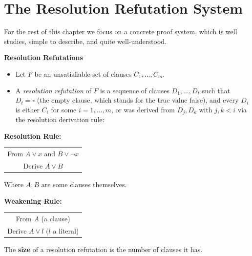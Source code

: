\section{The Resolution Refutation  System} 

For the rest of this chapter we focus on a  concrete proof system, which is well studies, simple to describe, and quite well-understood. 


\begin{tcolorbox}[colframe=white, colback=red!5, boxrule=0mm, sharp corners]
\textbf{Resolution Refutations}
\begin{itemize}
    \item Let $F$ be an unsatisfiable set of  clauses $C_1, \dots, C_m$.
    \item A \textit{resolution refutation} of $F$ is a sequence of clauses $D_1, \dots, D_t$ such that $D_t = \square$ (the empty clause, which stands for the true value false), and every $D_i$ is either $C_i$ for some $i=1,\dots,m$, or was derived from $D_j, D_k$ with $j,k < i$ via the resolution derivation rule:
\end{itemize}

\textbf{Resolution Rule:}
\begin{center}
    \begin{tabular}{c}
        \hline
        From $A \lor x$ and $B \lor \neg x$ \\
        Derive $A \lor B$ \\
        \hline
    \end{tabular}
\end{center}

Where $A, B$ are some clauses themselves.

\textbf{Weakening Rule:}
\begin{center}
    \begin{tabular}{c}
        \hline
        From $A$ (a clause) \\
        Derive $A \lor l$ ($l$ a literal) \\
        \hline
    \end{tabular}
\end{center}

The \textbf{size} of a resolution refutation is the number of clauses it has.
\end{tcolorbox}

